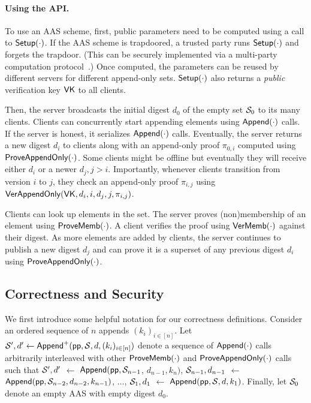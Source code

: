 \paragraph{Using the API.}
To use an AAS scheme, first, public parameters need to be computed using a call to $\mathsf{Setup}(\cdot)$.
If the AAS scheme is trapdoored, a trusted party runs $\mathsf{Setup}(\cdot)$ and forgets the trapdoor. 
(This can be securely implemented via a multi-party computation protocol~\cite{GMW87}.)
Once computed, the parameters can be reused by different servers for different append-only sets.
$\mathsf{Setup}(\cdot)$ also returns a \textit{public} verification key $\mathsf{VK}$ to all clients.

Then, the server broadcasts the initial digest $d_0$ of the empty set $\mathcal{S}_0$ to its many clients.
Clients can concurrently start appending elements using $\mathsf{Append}(\cdot)$ calls.
If the server is honest, it serializes $\mathsf{Append}(\cdot)$ calls.
Eventually, the server returns a new digest $d_i$ to clients along with an append-only proof $\pi_{0,i}$ computed using $\mathsf{ProveAppendOnly}(\cdot)$.
Some clients might be offline but eventually they will receive either $d_i$ or a newer $d_j, j > i$.
Importantly, whenever clients transition from version $i$ to $j$, they check an append-only proof $\pi_{i,j}$ using $\mathsf{VerAppendOnly}(\mathsf{VK}, d_i, i, d_j, j, \pi_{i,j})$.

Clients can look up elements in the set.
The server proves (non)membership of an element using $\mathsf{ProveMemb}(\cdot)$.
A client verifies the proof using $\mathsf{VerMemb}(\cdot)$ against their digest.
As more elements are added by clients, the server continues to publish a new digest $d_j$ and can prove it is a superset of any previous digest $d_i$ using $\mathsf{ProveAppendOnly}(\cdot)$.

\subsection{Correctness and Security}
\label{s:aas:correctness-and-security}
We first introduce some helpful notation for our correctness definitions.
Consider an ordered sequence of $n$ appends $(k_i)_{i\in [n]}$.
Let 
$\mathcal{S}',d' \leftarrow \mathsf{Append}^{+}(\mathsf{pp}, \mathcal{S}, d, (k_i)_{i\in [n]})$ 
denote a sequence of $\mathsf{Append}(\cdot)$ calls arbitrarily interleaved with other $\mathsf{ProveMemb}(\cdot)$ and $\mathsf{ProveAppendOnly}(\cdot)$ calls such that 
$\mathcal{S}',d'$ $\leftarrow$ $\mathsf{Append}(\mathsf{pp},\mathcal{S}_{n-1}$, $d_{n-1}, k_{n})$,
$\mathcal{S}_{n-1}, d_{n-1}$ $\leftarrow$ $\mathsf{Append}(\mathsf{pp},\mathcal{S}_{n-2}, d_{n-2}, k_{n-1})$,
$\dots$,
$\mathcal{S}_{1}, d_1$ $\leftarrow$ $\mathsf{Append}(\mathsf{pp},\mathcal{S}, d, k_{1})$.
Finally, let $\mathcal{S}_0$ denote an empty AAS with empty digest $d_0$.

